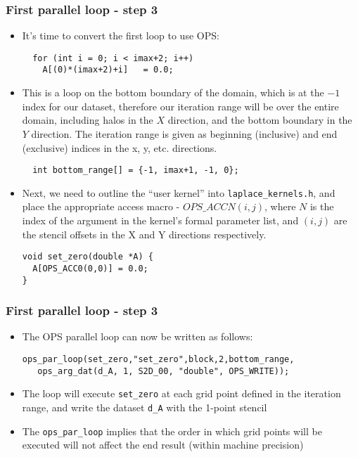 \documentclass{beamer}
\begin{document}
\begin{frame}[fragile]
\frametitle{First parallel loop - step 3}
\begin{itemize}
\item It's time to convert the first loop to use OPS:
\begin{lstlisting}
  for (int i = 0; i < imax+2; i++)
    A[(0)*(imax+2)+i]   = 0.0;
\end{lstlisting}
  \item This is a loop on the bottom boundary of the domain, which is at the $-1$ index for our dataset, therefore our iteration range will be over the entire domain, including halos in the $X$ direction, and the bottom boundary in the $Y$ direction. The iteration range is given as beginning (inclusive) and end (exclusive) indices in the x, y, etc. directions.
  \begin{lstlisting}
  int bottom_range[] = {-1, imax+1, -1, 0};
\end{lstlisting}
\item Next, we need to outline the ``user kernel'' into \texttt{laplace\_kernels.h}, and place the appropriate access macro - $OPS\_ACCN(i,j)$, where $N$ is the index of the argument in the kernel's formal parameter list, and $(i,j)$ are the stencil offsets in the X and Y directions respectively.
\begin{lstlisting}
void set_zero(double *A) {
  A[OPS_ACC0(0,0)] = 0.0;
}
\end{lstlisting}
\end{itemize}
\end{frame}

\begin{frame}[fragile]
\frametitle{First parallel loop - step 3}
\begin{itemize}
\item The OPS parallel loop can now be written as follows:
\begin{lstlisting}
ops_par_loop(set_zero,"set_zero",block,2,bottom_range,
   ops_arg_dat(d_A, 1, S2D_00, "double", OPS_WRITE));
\end{lstlisting}  
  \item The loop will execute \texttt{set\_zero} at each grid point defined in the iteration range, and write the dataset \texttt{d\_A} with the 1-point stencil
  \item The \texttt{ops\_par\_loop} implies that the order in which grid points will be executed will not affect the end result (within machine precision)
\end{itemize}
\end{frame}
\end{document}
